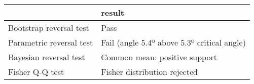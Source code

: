 \begin{tabular}{ll}
\toprule
{} &                                       result \\
\midrule
Bootstrap reversal test  &                                         Pass \\
Parametric reversal test &  Fail (angle 5.4º above 5.3º critical angle) \\
Bayesian reversal test   &                Common mean: positive support \\
Fisher Q-Q test          &                 Fisher distribution rejected \\
\bottomrule
\end{tabular}
